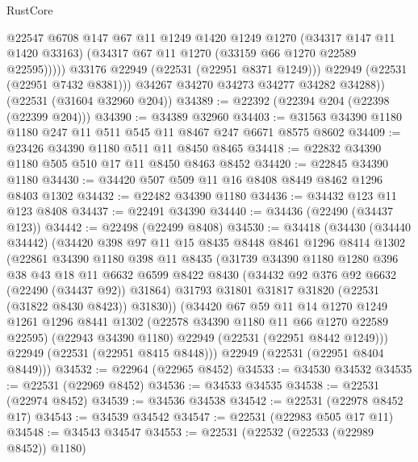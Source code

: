 \begin{lexlean}{RustCore}
\begin{coremodule}
                  @22547
                  @6708
                  @147
                  @67
                  @11
                  @1249
                  @1420
                  @1249
                  @1270
                  (@34317 @147 @11 @1420 @33163)
                  (@34317 @67 @11 @1270 (@33159 @66 @1270 @22589 @22595)))))
            @33176
            @22949
            (@22531 (@22951 @8371 @1249)))
          @22949
          (@22531 (@22951 @7432 @8381)))
        @34267
        @34270
        @34273
        @34277
        @34282
        @34288))
    (@22531 (@31604 @32960 @204))
@34389 := @22392 (@22394 @204 (@22398 (@22399 @204)))
@34390 := @34389 @32960
@34403 := @31563 @34390 @1180 @1180 @247 @11 @511 @545 @11 @8467 @247 @6671 @8575 @8602
@34409 := @23426 @34390 @1180 @511 @11 @8450 @8465
@34418 := @22832 @34390 @1180 @505 @510 @17 @11 @8450 @8463 @8452
@34420 := @22845 @34390 @1180
@34430 := @34420 @507 @509 @11 @16 @8408 @8449 @8462 @1296 @8403 @1302
@34432 := @22482 @34390 @1180
@34436 := @34432 @123 @11 @123 @8408
@34437 := @22491 @34390
@34440 := @34436 (@22490 (@34437 @123))
@34442 := @22498 (@22499 @8408)
@34530 := @34418
    (@34430
      (@34440 @34442)
      (@34420
        @398
        @97
        @11
        @15
        @8435
        @8448
        @8461
        @1296
        @8414
        @1302
        (@22861
          @34390
          @1180
          @398
          @11
          @8435
          (@31739
            @34390
            @1180
            @1280
            @396
            @38
            @43
            @18
            @11
            @6632
            @6599
            @8422
            @8430
            (@34432 @92 @376 @92 @6632 (@22490 (@34437 @92)) @31864)
            @31793
            @31801
            @31817
            @31820
            (@22531 (@31822 @8430 @8423))
            @31830))
        (@34420
          @67
          @59
          @11
          @14
          @1270
          @1249
          @1261
          @1296
          @8441
          @1302
          (@22578 @34390 @1180 @11 @66 @1270 @22589 @22595)
          (@22943 @34390 @1180)
          @22949
          (@22531 (@22951 @8442 @1249)))
        @22949
        (@22531 (@22951 @8415 @8448)))
      @22949
      (@22531 (@22951 @8404 @8449)))
@34532 := @22964 (@22965 @8452)
@34533 := @34530 @34532
@34535 := @22531 (@22969 @8452)
@34536 := @34533 @34535
@34538 := @22531 (@22974 @8452)
@34539 := @34536 @34538
@34542 := @22531 (@22978 @8452 @17)
@34543 := @34539 @34542
@34547 := @22531 (@22983 @505 @17 @11)
@34548 := @34543 @34547
@34553 := @22531 (@22532 (@22533 (@22989 @8452)) @1180)

\end{coremodule}
\end{lexlean}
